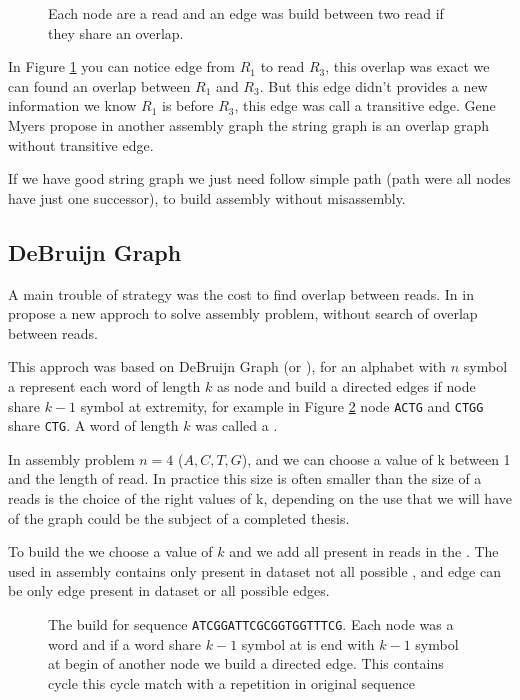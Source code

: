 \documentclass[./main.tex]{subfiles}
\begin{document}
\begin{figure}[ht]
    \centering 
    
    \caption{Each node are a read and an edge was build between two read if they share an overlap.}
    \label{intro:fig:olc:graph}
\end{figure}

In Figure \ref{intro:fig:olc:graph} you can notice edge from $R_1$ to read $R_3$, this overlap was exact we can found an overlap between $R_1$ and $R_3$. But this edge didn't provides a new information we know $R_1$ is before $R_3$, this edge was call a transitive edge. Gene Myers propose in \cite{string_graph} another assembly graph the string graph is an overlap graph without transitive edge.

If we have good string graph we just need follow simple path (path were all nodes have just one successor), to build assembly without misassembly.

\subsection{DeBruijn Graph}

A main trouble of \OLC strategy was the cost to find overlap between reads. In \citeauthor{eulerian_approach} in \cite{eulerian_approach} propose a new approch to solve assembly problem, without search of overlap between reads.

This approch was based on DeBruijn Graph (or \DBG), for an alphabet with $n$ symbol a \DBG represent each word of length $k$ as node and build a directed edges if node share $k - 1$ symbol at extremity, for example in Figure \ref{intro:fig:dbg:graph} node \texttt{ACTG} and \texttt{CTGG} share \texttt{CTG}. A word of length $k$ was called a \kmer.

In assembly problem $n = 4$ (${A, C, T, G}$), and we can choose a value of k between 1 and the length of read. In practice this size is often smaller than the size of a reads is the choice of the right values of k, depending on the use that we will have of the \DBG graph could be the subject of a completed thesis.

To build the \DBG we choose a value of $k$ and we add all \kmer present in reads in the \DBG. The \DBG used in assembly contains only \kmer present in dataset not all possible \kmer, and edge can be only edge present in dataset or all possible edges.

\begin{figure}[ht]
    
    \caption{The \DBG build for sequence \texttt{ATCGGATTCGCGGTGGTTTCG}. Each node was a word and if a word share $k - 1$ symbol at is end with $k - 1$ symbol at begin of another node we build a directed edge. This \DBG contains cycle this cycle match with a repetition in original sequence}
    \label{intro:fig:dbg:graph}
\end{figure}
\end{document}
